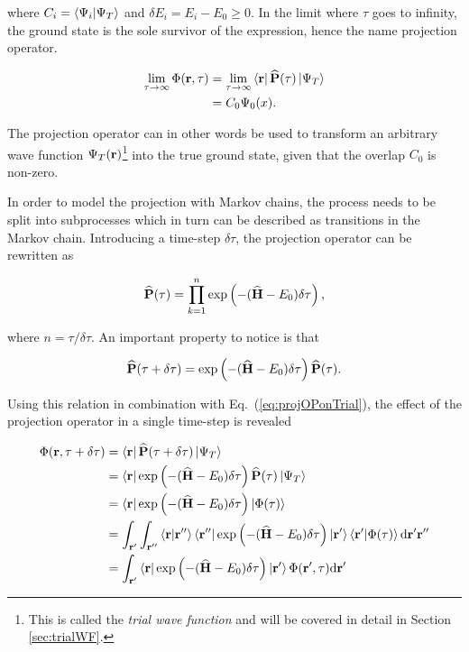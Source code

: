 where $C_i = \left\langle \Psi_i | \Psi_T\right\rangle$ and $\delta E_i = E_i - E_0 \ge 0$. In the limit where $\tau$ goes to infinity, the ground state is the sole survivor of the expression, hence the name projection operator.

\begin{align}
 \lim_{\tau\to\infty}\Phi(\mathbf{r}, \tau) &=  \lim_{\tau\to\infty}\left< \mathbf{r} \right|{\bf\widehat{P}}(\tau)\left| \Psi_T \right>\notag \\
                           &= C_0\Psi_0(x). \label{eq:ExactProjection}
\end{align}

The projection operator can in other words be used to transform an arbitrary wave function $\Psi_T(\mathbf{r})$\footnote{This is called the \textit{trial wave function} and will be covered in detail in Section \ref{sec:trialWF}.} into the true ground state, given that the overlap $C_0$ is non-zero.

In order to model the projection with Markov chains, the process needs to be split into subprocesses which in turn can be described as transitions in the Markov chain. Introducing a time-step $\delta\tau$, the projection operator can be rewritten as

\begin{equation}
 {\bf\widehat{P}}(\tau) = \prod_{k=1}^n \exp\left(-({\bf\widehat{H}} - E_0)\delta\tau\right),
\end{equation}

where $n = \tau/\delta\tau$. An important property to notice is that

\begin{equation}
 {\bf\widehat{P}}(\tau + \delta\tau) = \exp\left(-({\bf\widehat{H}} - E_0)\delta\tau\right){\bf\widehat{P}}(\tau).
\end{equation}

Using this relation in combination with Eq.~(\ref{eq:projOPonTrial}), the effect of the projection operator in a single time-step is revealed

\begin{align}
 \Phi(\mathbf{r}, \tau + \delta\tau) &= \left< \mathbf{r} \right|{\bf\widehat{P}}(\tau + \delta\tau)\left| \Psi_T \right> \notag \\
    &= \left< \mathbf{r} \right| \exp\left(-({\bf\widehat{H}} - E_0)\delta\tau\right){\bf\widehat{P}}(\tau)\left| \Psi_T \right> \notag \\
    &=  \left< \mathbf{r} \right| \exp\left(-({\bf\widehat{H}} - E_0)\delta\tau\right)\left| \Phi(\tau) \right> \notag \\
    &= \int_{\mathbf{r}'}\int_{\mathbf{r}''} \left\langle \mathbf{r} | \mathbf{r}''\right\rangle \left< \mathbf{r}'' \right|\exp\left(-({\bf\widehat{H}} - E_0)\delta\tau\right)\left| \mathbf{r}' \right>\left\langle \mathbf{r}' | \Phi(\tau)\right\rangle\mathrm{d}\mathbf{r}'\mathbf{r}'' \notag \\
    &= \int_{\mathbf{r}'}\left< \mathbf{r} \right|\exp\left(-({\bf\widehat{H}} - E_0)\delta\tau\right)\left| \mathbf{r}' \right>\Phi(\mathbf{r}', \tau)\mathrm{d}\mathbf{r}'
\end{align}

